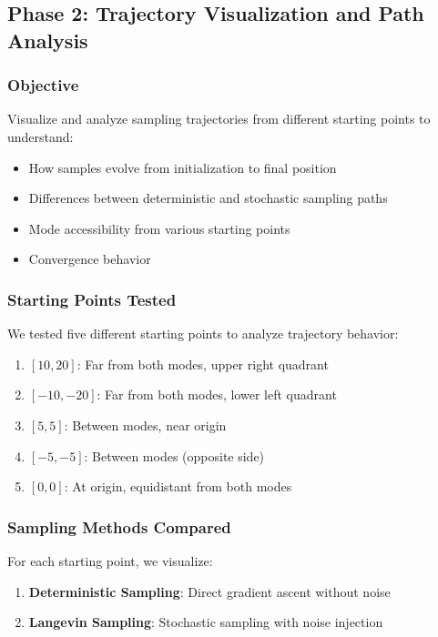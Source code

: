 \documentclass[journal]{IEEEtran}
\begin{document}
\subsection{Phase 2: Trajectory Visualization and Path Analysis}

\subsubsection{Objective}

Visualize and analyze sampling trajectories from different starting points to understand:
\begin{itemize}
    \item How samples evolve from initialization to final position
    \item Differences between deterministic and stochastic sampling paths
    \item Mode accessibility from various starting points
    \item Convergence behavior
\end{itemize}

\subsubsection{Starting Points Tested}

We tested five different starting points to analyze trajectory behavior:
\begin{enumerate}
    \item $[10, 20]$: Far from both modes, upper right quadrant
    \item $[-10, -20]$: Far from both modes, lower left quadrant
    \item $[5, 5]$: Between modes, near origin
    \item $[-5, -5]$: Between modes (opposite side)
    \item $[0, 0]$: At origin, equidistant from both modes
\end{enumerate}

\subsubsection{Sampling Methods Compared}

For each starting point, we visualize:
\begin{enumerate}
    \item \textbf{Deterministic Sampling}: Direct gradient ascent without noise
    \item \textbf{Langevin Sampling}: Stochastic sampling with noise injection
\end{enumerate}
\end{document}
